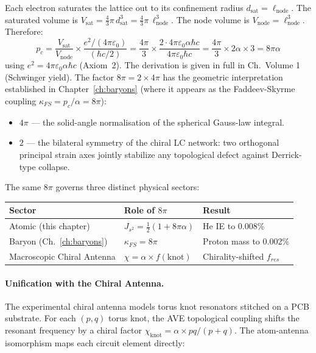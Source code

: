Each electron saturates the lattice out to its confinement
radius $d_{\text{sat}} = \ell_{\text{node}}$.  The saturated
volume is $V_{\text{sat}} = \frac{4}{3}\pi\,d_{\text{sat}}^3
= \frac{4}{3}\pi\,\ell_{\text{node}}^3$.
The node volume is $V_{\text{node}} = \ell_{\text{node}}^3$.
Therefore:
\begin{equation}
    p_c = \frac{V_{\text{sat}}}{V_{\text{node}}}
    \times \frac{e^2 / (4\pi\varepsilon_0)}{(\hbar c / 2)}
    = \frac{4\pi}{3} \times \frac{2 \cdot 4\pi\varepsilon_0
    \alpha\hbar c}{4\pi\varepsilon_0 \hbar c}
    = \frac{4\pi}{3} \times 2\alpha \times 3
    = 8\pi\alpha
\end{equation}
using $e^2 = 4\pi\varepsilon_0\alpha\hbar c$ (Axiom~2).
The derivation is given in full in
Ch.~Volume 1 (Schwinger yield).
The factor $8\pi = 2 \times 4\pi$ has the geometric interpretation established in Chapter~\ref{ch:baryons} (where it appears as the Faddeev-Skyrme coupling $\kappa_{FS} = p_c/\alpha = 8\pi$):
\begin{itemize}
    \item $4\pi$ --- the solid-angle normalisation of the spherical Gauss-law integral.
    \item $2$ --- the bilateral symmetry of the chiral LC network: two orthogonal principal strain axes jointly stabilize any topological defect against Derrick-type collapse.
\end{itemize}
The same $8\pi$ governs three distinct physical sectors:
\begin{center}
\small
\renewcommand{\arraystretch}{1.2}
\begin{tabular}{lll}
\toprule
\textbf{Sector} & \textbf{Role of $8\pi$} & \textbf{Result} \\
\midrule
Atomic (this chapter) & $J_{s^2} = \frac{1}{2}(1+8\pi\alpha)$ & He IE to 0.008\% \\
Baryon (Ch.~\ref{ch:baryons}) & $\kappa_{FS} = 8\pi$ & Proton mass to 0.002\% \\
Macroscopic Chiral Antenna & $\chi = \alpha \times f(\text{knot})$ & Chirality-shifted $f_{res}$ \\
\bottomrule
\end{tabular}
\end{center}

\paragraph{Unification with the Chiral Antenna.}
The experimental chiral antenna models torus knot resonators stitched on a PCB substrate. For each $(p,q)$ torus knot, the AVE topological coupling shifts the resonant frequency by a chiral factor $\chi_\text{knot} = \alpha \times pq/(p+q)$. The atom-antenna isomorphism maps each circuit element directly:

